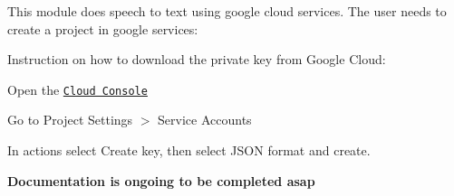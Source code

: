This module does speech to text using google cloud services. The user needs to create a project in google services\+:

Instruction on how to download the private key from Google Cloud\+:
\begin{DoxyEnumerate}
\item Open the \href{https://console.cloud.google.com}{\tt Cloud Console}
\item Go to Project Settings $>$ Service Accounts
\item In actions select \textquotesingle{}Create key\textquotesingle{}, then select J\+S\+ON format and \textquotesingle{}create\textquotesingle{}.
\end{DoxyEnumerate}

{\bfseries Documentation is ongoing to be completed asap} 